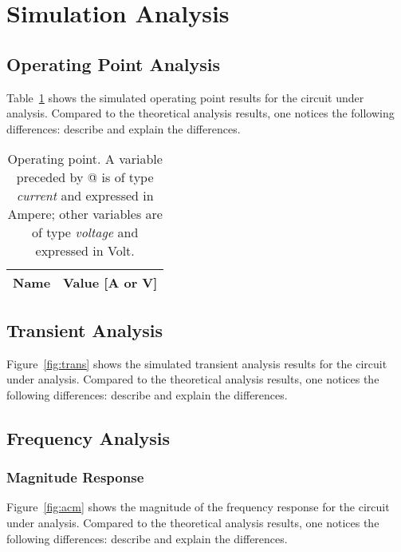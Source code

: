 \section{Simulation Analysis}
\label{sec:simulation}

\subsection{Operating Point Analysis}

Table~\ref{tab:op} shows the simulated operating point results for the circuit
under analysis. Compared to the theoretical analysis results, one notices the
following differences: describe and explain the differences.

\begin{table}[h]
  \centering
  \begin{tabular}{|l|r|}
    \hline    
    {\bf Name} & {\bf Value [A or V]} \\ \hline
    
  \end{tabular}
  \caption{Operating point. A variable preceded by @ is of type {\em current}
    and expressed in Ampere; other variables are of type {\it voltage} and expressed in
    Volt.}
  \label{tab:op}
\end{table}

\lipsum[1-1]


\subsection{Transient Analysis}

Figure~\ref{fig:trans} shows the simulated transient analysis results for the
circuit under analysis. Compared to the theoretical analysis results, one
notices the following differences: describe and explain the differences.


\lipsum[1-1]



\subsection{Frequency Analysis}

\subsubsection{Magnitude Response}

Figure~\ref{fig:acm} shows the magnitude of the frequency response for the
circuit under analysis. Compared to the theoretical analysis results, one
notices the following differences: describe and explain the differences.


